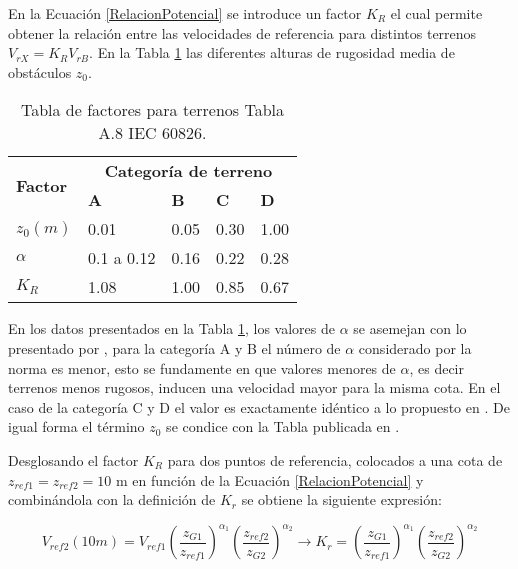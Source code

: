 En la Ecuación \eqref{RelacionPotencial} se introduce un factor $K_R$ el cual permite obtener la relación entre las velocidades de referencia para distintos terrenos $V_{rX}=K_RV_{rB}$. En la Tabla \ref{Tab:laValoresTerrenos} las diferentes alturas de rugosidad media de obstáculos $z_0$.


\begin{table}[h] 
	\begin{footnotesize} 
		\begin{center} 
			\begin{tabular}{ |p{3cm}|p{2cm}|p{2cm}|p{2cm}|p{2cm}|} \hline
				\multirow{2}{*}{\textbf{Factor}}  & \multicolumn{4}{|c|}{ \textbf{Categoría de terreno} }  \\ 
				& \textbf{A}& \textbf{B} &\textbf{C}&\textbf{D}\\
				\hline
				$z_0(m)$   & 0.01    &0.05&  0.30 & 1.00\\ \hline
				$\alpha$& 0.1 a 0.12  & 0.16 & 0.22 &0.28\\ \hline
				$K_R$ & 1.08 &1.00 &0.85&  0.67\\ \hline
			\end{tabular}
		\end{center} 
		\caption{Tabla de factores para terrenos Tabla A.8 IEC 60826.}
		\label{Tab:laValoresTerrenos} 
	\end{footnotesize} 
\end{table}

En los datos presentados en la Tabla \ref{Tab:laValoresTerrenos}, los valores de $\alpha$ se asemejan con lo presentado por \cite{Davenport1960}, para la categoría A y B el número de $\alpha$ considerado por la norma es menor, esto se fundamente en que valores menores de $\alpha$, es decir terrenos menos rugosos, inducen una velocidad mayor para la misma cota. En el caso de la categoría C y D el valor es exactamente idéntico a lo propuesto en \citep{Davenport1960} . De igual forma el término $z_0$ se condice con la Tabla publicada en \citep{Oke2000}.

Desglosando el factor $K_R$ para dos puntos de referencia, colocados a una cota de $z_{ref1}=z_{ref2}=10$ m en función de la Ecuación \eqref{RelacionPotencial} y combinándola con la definición de $K_r$ se obtiene la siguiente expresión: 

\begin{equation}\label{ValorKR}
	V_{ref2}(10m)=V_{ref1}\left(\frac{z_{G1}}{z_{ref1}}\right)^{\alpha_1}\left(\frac{z_{ref2}}{z_{G2}}\right)^{\alpha_2}\rightarrow K_r=\left(\frac{z_{G1}}{z_{ref1}}\right)^{\alpha_1}\left(\frac{z_{ref2}}{z_{G2}}\right)^{\alpha_2}
\end{equation}

